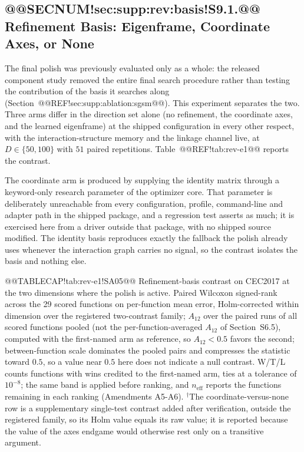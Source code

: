 \documentclass[10pt,a4paper]{article}
\begin{document}
\subsection{@@SECNUM!sec:supp:rev:basis!S9.1.@@ Refinement Basis: Eigenframe, Coordinate Axes, or None}\label{sec:supp:rev:basis}

The final polish was previously evaluated only as a whole: the released
component study removed the entire final search procedure rather than testing
the contribution of the basis it searches along
(Section~@@REF!sec:supp:ablation:sgsm@@).  This experiment separates the two.
Three arms differ in the direction set alone (no refinement, the coordinate
axes, and the learned eigenframe) at the shipped configuration in every
other respect, with the interaction-structure memory and the linkage channel
live, at $D \in \{50, 100\}$ with $51$ paired repetitions.
Table~@@REF!tab:rev-e1@@ reports the contrast.

The coordinate arm is produced by supplying the identity matrix through a
keyword-only research parameter of the optimizer core.  That parameter is
deliberately unreachable from every configuration, profile, command-line and
adapter path in the shipped package, and a regression test asserts as much;
it is exercised here from a driver outside that package, with no shipped
source modified.  The identity basis reproduces exactly the fallback the polish
already uses whenever the interaction graph carries no signal, so the contrast
isolates the basis and nothing else.



@@TABLECAP!tab:rev-e1!SA05@@ Refinement-basis contrast on CEC2017 at the two dimensions where the
polish is active.  Paired Wilcoxon signed-rank across the 29 scored functions on
per-function mean error, Holm-corrected within dimension over the registered
two-contrast family; $A_{12}$ over the paired runs of all scored functions
pooled (not the per-function-averaged $A_{12}$ of Section~S6.5), computed with the first-named
arm as reference, so $A_{12} < 0.5$ favors the second; between-function scale
dominates the pooled pairs and compresses the statistic toward $0.5$, so a
value near $0.5$ here does not indicate a null contrast.  W/T/L counts functions with wins
credited to the first-named arm, ties at a tolerance of $10^{-8}$; the same
band is applied before ranking, and
$n_{\mathrm{eff}}$ reports the functions remaining in each ranking
(Amendments A5-A6).  $^{\dagger}$The coordinate-versus-none row is a
supplementary single-test contrast added after verification, outside the registered
family, so its Holm value equals its raw value; it is reported because the value of
the axes endgame would otherwise rest only on a transitive
argument.
\end{document}
